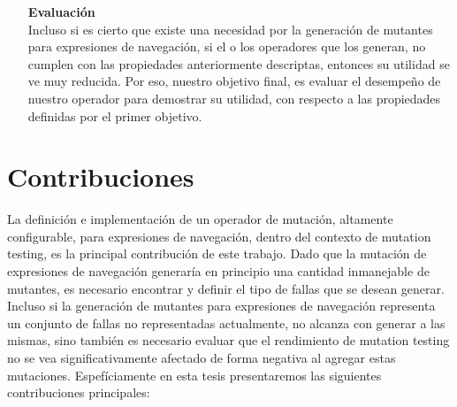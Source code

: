 \begin{enumerate}[leftmargin=.75cm,align=left,style=nextline]
	\item[\textbf{Evaluaci\'on}]\mbox{}\\
	Incluso si es cierto que existe una necesidad por la generaci\'on de mutantes para expresiones de navegaci\'on, si el o los operadores que los generan, no cumplen con las propiedades anteriormente descriptas, entonces su utilidad se ve muy reducida. Por eso, nuestro objetivo final, es evaluar el desempe\~no de nuestro operador para demostrar su utilidad, con respecto a las propiedades definidas por el primer objetivo.
\end{enumerate}


\section{Contribuciones}
\label{sec:intro.contribuciones}


La definici\'on e implementaci\'on de un operador de mutaci\'on, altamente configurable, para expresiones de navegaci\'on, dentro del contexto de mutation testing, es la principal contribuci\'on de este trabajo. Dado que la mutaci\'on de expresiones de navegaci\'on generar\'ia en principio una cantidad inmanejable de mutantes, es necesario encontrar y definir el tipo de fallas que se desean generar. Incluso si la generaci\'on de mutantes para expresiones de navegaci\'on representa un conjunto de fallas no representadas actualmente, no alcanza con generar a las mismas, sino tambi\'en es necesario evaluar que el rendimiento de mutation testing no se vea significativamente afectado de forma negativa al agregar estas mutaciones. Espef\'iciamente en esta tesis presentaremos las siguientes contribuciones principales:

